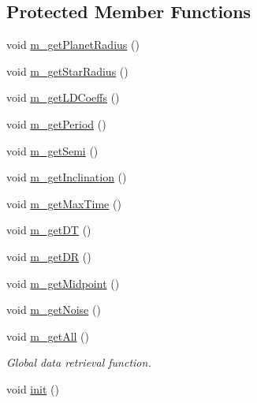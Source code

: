 \subsection*{Protected Member Functions}
\begin{DoxyCompactItemize}
\item 
void \hyperlink{classConfig_1_1Config_ab2f28785892ab6bea1af4df4d4caf93a}{m\_\-getPlanetRadius} ()
\item 
void \hyperlink{classConfig_1_1Config_a54e1763c19f3d2418005a2419cb9eb27}{m\_\-getStarRadius} ()
\item 
void \hyperlink{classConfig_1_1Config_a885f61f26d416fc460fcb01ae79e5a05}{m\_\-getLDCoeffs} ()
\item 
void \hyperlink{classConfig_1_1Config_a2341de58cf443afd26c4b258d0a287ea}{m\_\-getPeriod} ()
\item 
void \hyperlink{classConfig_1_1Config_a19d12b578cebc897ad0c5aaafc391f6a}{m\_\-getSemi} ()
\item 
void \hyperlink{classConfig_1_1Config_a4ce8f61abcabce4ccad266d58cc27bdd}{m\_\-getInclination} ()
\item 
void \hyperlink{classConfig_1_1Config_a178d0dbcf71e20379a9269dc6e403539}{m\_\-getMaxTime} ()
\item 
void \hyperlink{classConfig_1_1Config_a902f1fcfd33f840b45d9973402e928ce}{m\_\-getDT} ()
\item 
void \hyperlink{classConfig_1_1Config_a7b847ddb671a80c3e9234f070e8d7f06}{m\_\-getDR} ()
\item 
void \hyperlink{classConfig_1_1Config_adbb674970bddcda634ec49fd168b43e7}{m\_\-getMidpoint} ()
\item 
void \hyperlink{classConfig_1_1Config_a191605695b16e5a91d8f989b0c6e2d43}{m\_\-getNoise} ()
\item 
void \hyperlink{classConfig_1_1Config_aeb68940be8481ce24555f294b5e72570}{m\_\-getAll} ()
\begin{DoxyCompactList}\small\item\em Global data retrieval function. \item\end{DoxyCompactList}\item 
void \hyperlink{classConfig_1_1Config_ad83da68d740dac994311fedd2d85c412}{init} ()
\end{DoxyCompactItemize}
